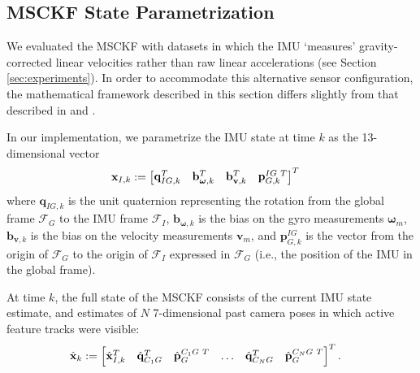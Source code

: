 \documentclass[letterpaper, 10 pt, conference]{ieeeconf}  %
\def\Vec#1{\mathbf{#1}}
\newcommand{\bbm}{\begin{bmatrix}}
\newcommand{\ebm}{\end{bmatrix}}
\begin{document}
\subsection{MSCKF State Parametrization}
We evaluated the MSCKF with datasets in which the IMU `measures' gravity-corrected linear velocities rather than raw linear accelerations (see Section \ref{sec:experiments}).
In order to accommodate this alternative sensor configuration, the mathematical framework described in this section differs slightly from that described in \cite{Mourikis:2006:TechReport} and \cite{Mourikis:2007:ICRA}.

In our implementation, we parametrize the IMU state at time $k$ as the 13-dimensional vector
\begin{align}
    \Vec{x}_{I,k} &:= \bbm \Vec{q}_{IG,k}^T & \Vec{b}_{\boldsymbol{\omega},k}^T & \Vec{b}_{\Vec{v},k}^T & \Vec{p}_{G,k}^{IG \hspace{0.3em} T} \ebm^T
\end{align}
where $\Vec{q}_{IG,k}$ is the unit quaternion representing the rotation from the global frame $\mathcal{F}_G$ to the IMU frame $\mathcal{F}_I$, $\Vec{b}_{\boldsymbol{\omega},k}$ is the bias on the gyro measurements $\boldsymbol{\omega}_m$, $\Vec{b}_{\Vec{v},k}$ is the bias on the velocity measurements $\Vec{v}_m$, and $\Vec{p}_{G,k}^{IG}$ is the vector from the origin of $\mathcal{F}_G$ to the origin of $\mathcal{F}_I$ expressed in $\mathcal{F}_G$ (i.e., the position of the IMU in the global frame).

At time $k$, the full state of the MSCKF consists of the current IMU state estimate, and estimates of $N$ 7-dimensional past camera poses in which active feature tracks were visible:
\begin{align*}
    \hat{\Vec{x}}_k &:= \bbm \hat{\Vec{x}}_{I,k}^T & \hat{\Vec{q}}_{C_1 G}^T & \hat{\Vec{p}}_G^{C_1 G \hspace{0.3em} T} & \hdots & \hat{\Vec{q}}_{C_N G}^T & \hat{\Vec{p}}_G^{C_N G \hspace{0.3em} T} \ebm ^T.
\end{align*}
\end{document}
